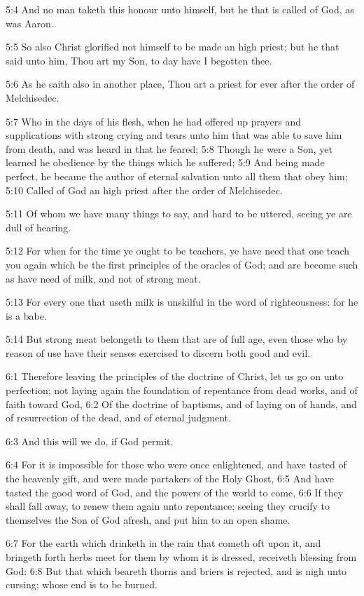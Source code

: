 5:4 And no man taketh this honour unto himself, but he that is called
of God, as was Aaron.

5:5 So also Christ glorified not himself to be made an high priest;
but he that said unto him, Thou art my Son, to day have I begotten
thee.

5:6 As he saith also in another place, Thou art a priest for ever
after the order of Melchisedec.

5:7 Who in the days of his flesh, when he had offered up prayers and
supplications with strong crying and tears unto him that was able to
save him from death, and was heard in that he feared; 5:8 Though he
were a Son, yet learned he obedience by the things which he suffered;
5:9 And being made perfect, he became the author of eternal salvation
unto all them that obey him; 5:10 Called of God an high priest after
the order of Melchisedec.

5:11 Of whom we have many things to say, and hard to be uttered,
seeing ye are dull of hearing.

5:12 For when for the time ye ought to be teachers, ye have need that
one teach you again which be the first principles of the oracles of
God; and are become such as have need of milk, and not of strong meat.

5:13 For every one that useth milk is unskilful in the word of
righteousness: for he is a babe.

5:14 But strong meat belongeth to them that are of full age, even
those who by reason of use have their senses exercised to discern both
good and evil.

6:1 Therefore leaving the principles of the doctrine of Christ, let us
go on unto perfection; not laying again the foundation of repentance
from dead works, and of faith toward God, 6:2 Of the doctrine of
baptisms, and of laying on of hands, and of resurrection of the dead,
and of eternal judgment.

6:3 And this will we do, if God permit.

6:4 For it is impossible for those who were once enlightened, and have
tasted of the heavenly gift, and were made partakers of the Holy
Ghost, 6:5 And have tasted the good word of God, and the powers of the
world to come, 6:6 If they shall fall away, to renew them again unto
repentance; seeing they crucify to themselves the Son of God afresh,
and put him to an open shame.

6:7 For the earth which drinketh in the rain that cometh oft upon it,
and bringeth forth herbs meet for them by whom it is dressed,
receiveth blessing from God: 6:8 But that which beareth thorns and
briers is rejected, and is nigh unto cursing; whose end is to be
burned.

